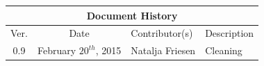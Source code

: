 \documentclass[a4paper]{article}
\begin{document}
\begin{center}
  \begin{tabular}{|c|c|p{6cm}|p{7cm}|}
    \hline
    \multicolumn{4}{|c|}{\cellcolor{CornflowerBlue}Document History} \\
    \hline
    \rowcolor{LightSteelBlue}
    Ver. & Date & Contributor(s) & Description \\     \hline
    0.9 & February $20^{th}$, 2015 & Natalja Friesen & Cleaning \\     \hline
   \end{tabular}
\end{center}

\newpage

\tableofcontents
\newpage

\listoffigures
\listoftables
\newpage


% 


\clearpage

\clearpage

\clearpage

\clearpage





\appendix
\end{document}
